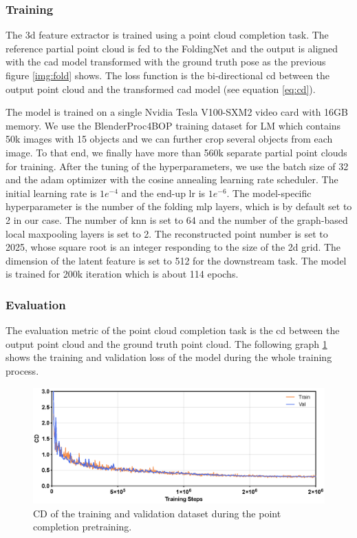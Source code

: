 \documentclass[12pt,DIV14,BCOR12mm,a4paper,footinclude=false,headinclude,parskip=half-,twoside,openright,cleardoublepage=empty,toc=index,bibliography=totoc,listof=totoc]{scrreprt}
\numberwithin{equation}{chapter}
\begin{document}
\subsubsection{Training} 
The \gls{3d} feature extractor is trained using a point cloud completion task. The reference partial point cloud is fed to the FoldingNet and the output is aligned with the \gls{cad} model transformed with the ground truth pose as the previous figure \ref{img:fold} shows. The loss function is the bi-directional \gls{cd} between the output point cloud and the transformed \gls{cad} model (see equation \ref{eq:cd}).

The model is trained on a single Nvidia Tesla V100-SXM2 video card with 16GB memory. We use the BlenderProc4BOP training dataset for LM which contains 50k images with 15 objects and we can further crop several objects from each image. To that end, we finally have more than 560k separate partial point clouds for training. After the tuning of the hyperparameters, we use the batch size of 32 and the \gls{adam} optimizer with the cosine annealing learning rate scheduler. The initial learning rate is $1e^{-4}$ and the end-up \gls{lr} is $1e^{-6}$. The model-specific hyperparameter is the number of the folding \gls{mlp} layers, which is by default set to 2 in our case. The number of \gls{knn} is set to 64 and the number of the graph-based local maxpooling layers is set to 2. The reconstructed point number is set to 2025, whose square root is an integer responding to the size of the \gls{2d} grid. The dimension of the latent feature is set to 512 for the downstream task. The model is trained for 200k iteration which is about 114 epochs.
\subsubsection{Evaluation} 
The evaluation metric of the point cloud completion task is the \gls{cd} between the output point cloud and the ground truth point cloud. The following graph \ref{img:fold_loss} shows the training and validation loss of the model during the whole training process. 

\begin{figure}[h]
	\centering
	\includegraphics[width=1.\textwidth]{img/fold_loss.eps}
	\caption{CD of the training and validation dataset during the point completion pretraining.}
	\label{img:fold_loss}
\end{figure}
\end{document}
